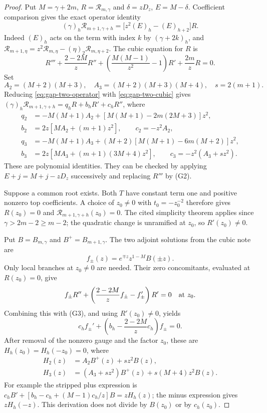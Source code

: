 \documentclass[11pt]{article}
\begin{document}
\begin{proof}
Put $M=\gamma+2m$, $R=\mathcal R_{m,\gamma}$ and
$\delta=zD_z$, $E=M-\delta$.
Coefficient comparison gives the exact operator identity
\[
 (\gamma)_h\mathcal R_{m+1,\gamma+h}
       =\bigl[z^2(E)_h-(E)_{h+2}\bigr]R.                  \tag{G1}\label{eq:gap-two-operator}
\]
Indeed $(E)_h$ acts on the term with index $k$ by
$(\gamma+2k)_h$, and
$\mathcal R_{m+1,\eta}=z^2\mathcal R_{m,\eta}
                         -(\eta)_2\mathcal R_{m,\eta+2}$.
The cubic equation for $R$ is
\[
 R'''+\frac{2-2M}{z}R''
       +\left(\frac{M(M-1)}{z^2}-1\right)R'
       +\frac{2m}{z}R=0.                                 \tag{G2}\label{eq:gap-two-cubic}
\]
Set
\[
 A_2=(M+2)(M+3),\quad A_3=(M+2)(M+3)(M+4),\quad s=2(m+1).
\]
Reducing \eqref{eq:gap-two-operator} with \eqref{eq:gap-two-cubic}
gives $(\gamma)_h\mathcal R_{m+1,\gamma+h}=q_hR+b_hR'+c_hR''$,
where
\[
\begin{aligned}
 q_2&=-M(M+1)A_2+[M(M+1)-2m(2M+3)]z^2,\\
 b_2&=2z[MA_2+(m+1)z^2],\qquad c_2=-z^2A_2,\\
 q_3&=-M(M+1)A_3+(M+2)[M(M+1)-6m(M+2)]z^2,\\
 b_3&=2z[MA_3+(m+1)(3M+4)z^2],\qquad
 c_3=-z^2(A_3+sz^2).
\end{aligned}                                               \tag{G3}\label{eq:gap-two-reduction}
\]
These are polynomial identities. They can be checked by applying
$E+j=M+j-zD_z$ successively and replacing $R'''$ by (G2).

Suppose a common root exists. Both $T$ have constant term one and
positive nonzero top coefficients. A choice of $z_0\ne0$ with
$t_0=-z_0^{-2}$ therefore gives $R(z_0)=0$ and
$\mathcal R_{m+1,\gamma+h}(z_0)=0$.
The cited simplicity theorem applies since $\gamma>2m-2\ge m-2$;
the quadratic change is unramified at $z_0$, so $R'(z_0)\ne0$.

Put $B=B_{m,\gamma}$ and $B^+=B_{m+1,\gamma}$. The two adjoint
solutions from the cubic note are
\[
 f_\pm(z)=e^{\mp z}z^{1-M}B(\pm z).
\]
Only local branches at $z_0\ne0$ are needed. Their zero concomitants,
evaluated at $R(z_0)=0$, give
\[
 f_\pm R''+
 \left(\frac{2-2M}{z}f_\pm-f_\pm'\right)R'=0
 \quad\hbox{at }z_0.
\]
Combining this with (G3), and using $R'(z_0)\ne0$, yields
\[
 c_h f_\pm'+
       \left(b_h-\frac{2-2M}{z}c_h\right)f_\pm=0.
\]
After removal of the nonzero gauge and the factor $z_0$, these
are $H_h(z_0)=H_h(-z_0)=0$, where
\[
 \begin{split}
 H_2(z)&=A_2B^+(z)+sz^2B(z),\\
 H_3(z)&=(A_3+sz^2)B^+(z)+s(M+4)z^2B(z).
 \end{split}                                             \tag{G4}\label{eq:gap-two-transformed-adjoint}
\]
For example the stripped plus expression is
$c_hB'+[b_h-c_h+(M-1)c_h/z]B=zH_h(z)$;
the minus expression gives $zH_h(-z)$.
This derivation does not divide by $B(z_0)$ or by $c_h(z_0)$.


\end{proof}
\end{document}
